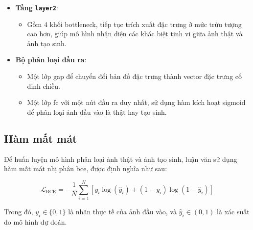 \begin{itemize}
		\item \textbf{Tầng \texttt{layer2}}:
		\begin{itemize}
			\item Gồm 4 khối \gls{bottleneck}, tiếp tục trích xuất đặc trưng ở mức trừu tượng cao hơn, giúp mô hình nhận diện các khác biệt tinh vi giữa ảnh thật và ảnh tạo sinh.
		\end{itemize}
		
		\item \textbf{Bộ phân loại đầu ra}:
		\begin{itemize}
			\item Một lớp \gls{gap} để chuyển đổi bản đồ đặc trưng thành vector đặc trưng cố định chiều.
			\item Một lớp \gls{fc} với một nút đầu ra duy nhất, sử dụng hàm kích hoạt \gls{sigmoid} để phân loại ảnh đầu vào là thật hay tạo sinh.
		\end{itemize}
\end{itemize}

\subsection{Hàm mất mát}
\label{ss:ham_mat_mat_bce}
Để huấn luyện mô hình phân loại ảnh thật và ảnh tạo sinh, luận văn sử dụng hàm mất mát nhị phân \gls{bce}, được định nghĩa như sau:

\begin{equation}
	\mathcal{L}_{\mathrm{BCE}} = -\frac{1}{N} \sum_{i=1}^{N} \left[ y_i \log(\hat{y}_i) + (1 - y_i)\log(1 - \hat{y}_i) \right]
\end{equation}

Trong đó, \( y_i \in \{0, 1\} \) là nhãn thực tế của ảnh đầu vào, và \( \hat{y}_i \in (0, 1) \) là xác suất do mô hình dự đoán.

